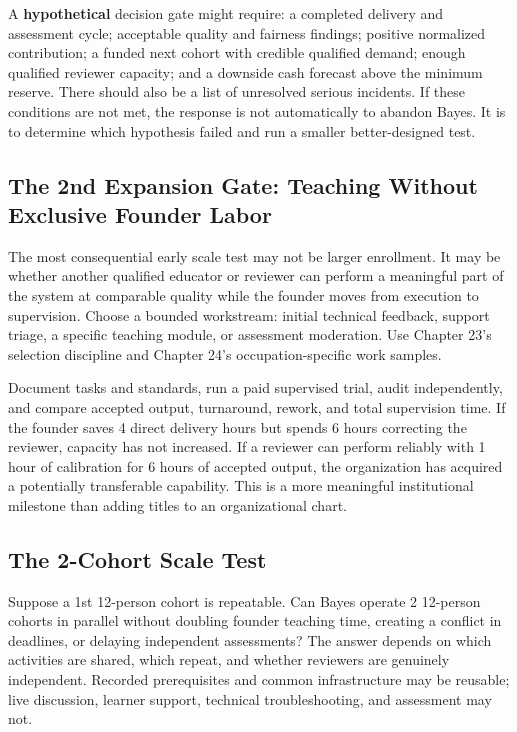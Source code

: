 A \textbf{hypothetical} decision gate might require: a completed delivery and assessment cycle; acceptable quality and fairness findings; positive normalized contribution; a funded next cohort with credible qualified demand; enough qualified reviewer capacity; and a downside cash forecast above the minimum reserve. There should also be a list of unresolved serious incidents. If these conditions are not met, the response is not automatically to abandon Bayes. It is to determine which hypothesis failed and run a smaller better-designed test.

\subsection{The 2nd Expansion Gate: Teaching Without Exclusive Founder Labor}
\label{sec:second_expansion_gate_delegated_labor}

The most consequential early scale test may not be larger enrollment. It may be whether another qualified educator or reviewer can perform a meaningful part of the system at comparable quality while the founder moves from execution to supervision. Choose a bounded workstream: initial technical feedback, support triage, a specific teaching module, or assessment moderation. Use Chapter 23's selection discipline and Chapter 24's occupation-specific work samples.

Document tasks and standards, run a paid supervised trial, audit independently, and compare accepted output, turnaround, rework, and total supervision time. If the founder saves 4 direct delivery hours but spends 6 hours correcting the reviewer, capacity has not increased. If a reviewer can perform reliably with 1 hour of calibration for 6 hours of accepted output, the organization has acquired a potentially transferable capability. This is a more meaningful institutional milestone than adding titles to an organizational chart.

\subsection{The 2-Cohort Scale Test}
\label{sec:two_cohort_scale_test}

Suppose a 1st 12-person cohort is repeatable. Can Bayes operate 2 12-person cohorts in parallel without doubling founder teaching time, creating a conflict in deadlines, or delaying independent assessments? The answer depends on which activities are shared, which repeat, and whether reviewers are genuinely independent. Recorded prerequisites and common infrastructure may be reusable; live discussion, learner support, technical troubleshooting, and assessment may not.

